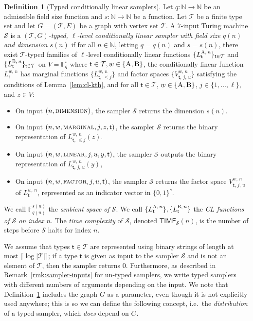 \documentclass[11pt]{article}
\theoremstyle{definition}
\newtheorem{definition}[theorem]{Definition}
\newcommand{\N}{\ensuremath{\mathbb{N}}}
\newcommand{\F}{\ensuremath{\mathbb{F}}}
\newcommand{\sampler}{\mathcal{S}}
\newcommand{\type}{\mathcal{T}}
\newcommand{\gamestyle}[1]{\ensuremath{\textsc{#1}}\xspace}
\newcommand{\labelstyle}[1]{\ensuremath{\textsc{#1}}\xspace}
\newcommand{\tvarstyle}[1]{\mathsf{#1}}
\newcommand{\tvar}{\ensuremath{\tvarstyle{t}}}
\newcommand{\alice}{\labelstyle{A}}
\newcommand{\bob}{\labelstyle{B}}
\newcommand{\ab}{\{\alice, \bob\}}
\newcommand{\AB}{\{\alice, \bob\}}
\newcommand{\TIME}{\mathsf{TIME}}
\begin{document}
\begin{definition}[Typed conditionally linear samplers]
  \label{def:typed-sampler}
	Let $q:\N \to \N$ be an admissible field size function and $s: \N \to \N$ be a
  function.
  Let $\type$ be a finite type set and let $G = (\type, E)$ be a graph with vertex set $\type$.
  A $7$-input Turing machine $\sampler$ is a \emph{$(\type, G)$-typed, $\ell$-level
    conditionally linear sampler with field size $q(n)$ and dimension $s(n)$} if
  for all $n \in \N$, letting $q = q(n)$ and $s = s(n)$, there exist
  $\type$-typed families of $\ell$-level conditionally linear functions
  $\{L^{\alice,\, n}_{\tvar}\}_{\tvar \in \type}$ and $\{L^{\bob,\,
    n}_{\tvar}\}_{\tvar \in \type}$ on $V = \F_q^s$ where $\tvar \in \type, w\in
  \AB$, the conditionally linear function $L^{w,\, n}_{\tvar}$ has marginal
  functions $\{L^{w,\, n}_{\tvar,\, \leq j}\}$ and factor spaces $\{V^{w,\,
    n}_{\tvar,\, j,\, u}\}$ satisfying the conditions of Lemma~\ref{lem:cl-kth},
  and for all $\tvar \in \type$, $w \in \ab$, $j \in \{1, \ldots, \ell\}$, and
  $z \in V$:
  \begin{itemize}
  \item On input $(n, \gamestyle{dimension})$, the sampler $\sampler$ returns
    the dimension $s(n)$.
	
	\item On input $(n, w, \gamestyle{marginal}, j, z, \tvar)$, the sampler
    $\sampler$ returns the binary representation of $L^{w,\, n}_{\tvar,\, \le
      j}(z)$.
			
			\item On input $(n, w, \gamestyle{linear}, j, u, y, \tvar)$, the sampler $\sampler$
    outputs the binary representation of $L^{w,\, n}_{\tvar,\, j,\, u}(y)$,

	\item On input $(n, w, \gamestyle{factor}, j, u, \tvar)$, the sampler
    $\sampler$ returns the factor space $V^{w,\, n}_{\tvar,\, j,\, u}$ of
    $L^{w,\, n}_{\tvar}$, represented as an indicator vector in $\{0,1\}^s$.
  \end{itemize}
  We call $\F_{q(n)}^{s(n)}$ the \emph{ambient space of $\sampler$}.
  We call $\{ L^{\alice,\, n}_{\tvar} \}, \{ L^{\bob,\, n}_{\tvar} \}$ the
  \emph{CL functions of $\sampler$ on index $n$}.
  The \emph{time complexity} of $\sampler$, denoted $\TIME_\sampler(n)$, is the
  number of steps before $\sampler$ halts for index $n$.
\end{definition}

We assume that types $\tvar \in \type$ are represented using binary strings of
length at most $\lceil \log |\type| \rceil$; if a type $\tvar$ is given as input
to the sampler $\sampler$ and is not an element of $\type$, then the sampler
returns $0$.
Furthermore, as described in Remark~\ref{rmk:sampler-inputs} for un-typed
samplers, we write typed samplers with different numbers of arguments depending
on the input.
We note that Definition~\ref{def:typed-sampler} includes the graph $G$ as a parameter, even though it is not explicitly used anywhere;
this is so we can define the following concept, i.e.\ the \emph{distribution} of a typed sampler, which \emph{does} depend on $G$.
\end{document}

